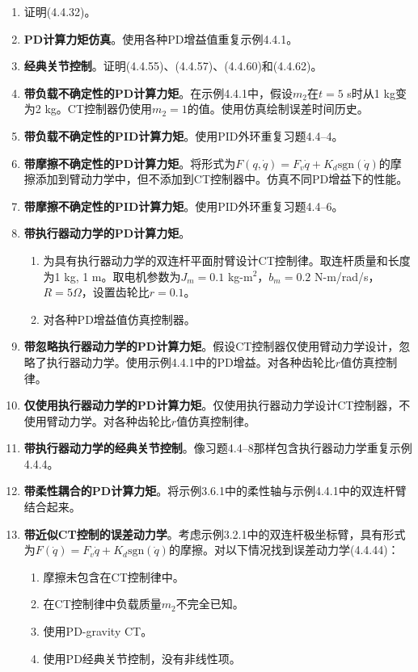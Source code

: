 \documentclass[UTF8]{ctexart}
\theoremstyle{definition}
\begin{document}
\begin{enumerate}[label=4.4--\arabic*, resume]
\item 证明(4.4.32)。

\item \textbf{PD计算力矩仿真}。使用各种PD增益值重复示例4.4.1。

\item \textbf{经典关节控制}。证明(4.4.55)、(4.4.57)、(4.4.60)和(4.4.62)。

\item \textbf{带负载不确定性的PD计算力矩}。在示例4.4.1中，假设$m_2$在$t=5$ s时从1 kg变为2 kg。CT控制器仍使用$m_2=1$的值。使用仿真绘制误差时间历史。

\item \textbf{带负载不确定性的PID计算力矩}。使用PID外环重复习题4.4--4。

\item \textbf{带摩擦不确定性的PD计算力矩}。将形式为$F(q, \dot{q}) = F_v\dot{q} + K_d\text{sgn}(\dot{q})$的摩擦添加到臂动力学中，但不添加到CT控制器中。仿真不同PD增益下的性能。

\item \textbf{带摩擦不确定性的PID计算力矩}。使用PID外环重复习题4.4--6。

\item \textbf{带执行器动力学的PD计算力矩}。
\begin{enumerate}[label=(\alph*)]
\item 为具有执行器动力学的双连杆平面肘臂设计CT控制律。取连杆质量和长度为1 kg, 1 m。取电机参数为$J_m=0.1$ kg-m$^2$，$b_m=0.2$ N-m/rad/s，$R=5\Omega$，设置齿轮比$r=0.1$。
\item 对各种PD增益值仿真控制器。
\end{enumerate}

\item \textbf{带忽略执行器动力学的PD计算力矩}。假设CT控制器仅使用臂动力学设计，忽略了执行器动力学。使用示例4.4.1中的PD增益。对各种齿轮比$r$值仿真控制律。

\item \textbf{仅使用执行器动力学的PD计算力矩}。仅使用执行器动力学设计CT控制器，不使用臂动力学。对各种齿轮比$r$值仿真控制律。

\item \textbf{带执行器动力学的经典关节控制}。像习题4.4--8那样包含执行器动力学重复示例4.4.4。

\item \textbf{带柔性耦合的PD计算力矩}。将示例3.6.1中的柔性轴与示例4.4.1中的双连杆臂结合起来。

\item \textbf{带近似CT控制的误差动力学}。考虑示例3.2.1中的双连杆极坐标臂，具有形式为$F(\dot{q})=F_v\dot{q}+K_d\text{sgn}(\dot{q})$的摩擦。对以下情况找到误差动力学(4.4.44)：
\begin{enumerate}[label=(\alph*)]
\item 摩擦未包含在CT控制律中。
\item 在CT控制律中负载质量$m_2$不完全已知。
\item 使用PD-gravity CT。
\item 使用PD经典关节控制，没有非线性项。
\end{enumerate}
\end{enumerate}
\end{document}
